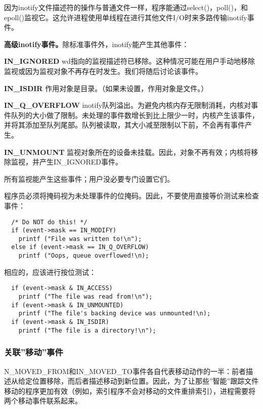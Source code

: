 因为inotify文件描述符的操作与普通文件一样，程序能通过select()，poll()，和epoll()监视它。这允许进程使用单线程在进行其他文件I/O时来多路传输inotify事件。

\textbf{高级inotify事件。}除标准事件外，inotify能产生其他事件：

\begin{eqlist*}
\item[\textbf{IN\_IGNORED}] wd指向的监视描述符已移除。这种情况可能在用户手动地移除监视或因为监视对象不再存在时发生。我们将随后讨论该事件。
\item[\textbf{IN\_ISDIR}] 作用对象是目录。（如果未设置，作用对象是文件。）
\item[\textbf{IN\_Q\_OVERFLOW}] inotify队列溢出。为避免内核内存无限制消耗，内核对事件队列的大小做了限制。未处理的事件数增长到比上限少一时，内核产生该事件，并将其添加至队列尾部。队列被读取，其大小减至限制以下前，不会再有事件产生。
\item[\textbf{IN\_UNMOUNT}] 监视对象所在的设备未挂载。因此，对象不再有效；内核将移除监视，并产生IN\_IGNORED事件。
\end{eqlist*}

所有监视能产生这些事件；用户没必要专门设置它们。

程序员必须将掩码视为未处理事件的位掩码。因此，不要使用直接等价测试来检查事件：

\begin{lstlisting}
  /* Do NOT do this! */
  if (event->mask == IN_MODIFY)
    printf ("File was written to!\n");
  else if (event->mask == IN_Q_OVERFLOW)
    printf ("Oops, queue overflowed!\n);
\end{lstlisting}

相应的，应该进行按位测试：

\begin{lstlisting}
  if (event->mask & IN_ACCESS)
    printf ("The file was read from!\n");
  if (event->mask & IN_UNMOUNTED)
    printf ("The file's backing device was unmounted!\n);
  if (event->mask & IN_ISDIR)
    printf ("The file is a directory!\n");
\end{lstlisting}

\subsubsection{关联''移动''事件}

N\_MOVED\_FROM和IN\_MOVED\_TO事件各自代表移动动作的一半：前者描述从给定位置移除，而后者描述移动到新位置。因此，为了让那些''智能''跟踪文件移动的程序更加有效（例如，索引程序不会对移动的文件重排索引），进程需要将两个移动事件联系起来。

